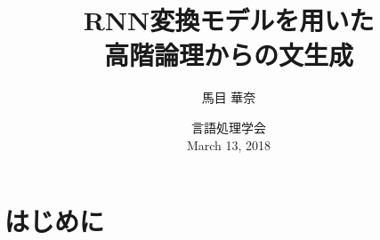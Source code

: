 \documentclass[dvipdfmx]{beamer}
\title{RNN変換モデルを用いた\\高階論理からの文生成}
\author[]{馬目 華奈}
\institute{お茶の水女子大学 戸次研究室}
\date{
言語処理学会\\
March 13, 2018}
\begin{document}
\begin{frame}
  \titlepage
\end{frame}



\section{はじめに}

\end{document}

